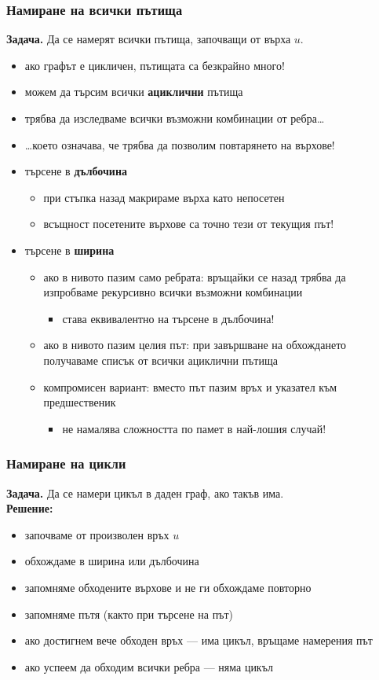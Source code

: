 \documentclass[alsotrans,beameroptions={aspectratio=169}]{beamerswitch}
\begin{document}
\begin{frame}
  \frametitle{Намиране на всички пътища}
  \textbf{Задача. } Да се намерят всички пътища, започващи от върха $u$.\pause
  \begin{itemize}[<+->]
  \item ако графът е цикличен, пътищата са безкрайно много!
  \item можем да търсим всички \textbf{ациклични} пътища
  \item трябва да изследваме всички възможни комбинации от ребра\ldots
  \item \ldots което означава, че трябва да позволим повтарянето на върхове!
  \item търсене в \textbf{дълбочина}
    \begin{itemize}
    \item при стъпка назад макрираме върха като непосетен
    \item всъщност посетените върхове са точно тези от текущия път!
    \end{itemize}
  \item търсене в \textbf{ширина}
    \begin{itemize}
    \item ако в нивото пазим само ребрата: връщайки се назад трябва да изпробваме рекурсивно всички възможни комбинации
      \begin{itemize}
      \item става еквивалентно на търсене в дълбочина!
      \end{itemize}
    \item ако в нивото пазим целия път: при завършване на обхождането получаваме списък от всички ациклични пътища
    \item компромисен вариант: вместо път пазим връх и указател към предшественик
      \begin{itemize}
      \item не намалява сложността по памет в най-лошия случай!
      \end{itemize}
    \end{itemize}
  \end{itemize}
\end{frame}

\begin{frame}
  \frametitle{Намиране на цикли}
  \textbf{Задача. }Да се намери цикъл в даден граф, ако такъв има.\\
  \pause
  \textbf{Решение:}\\
  \begin{itemize}[<+->]
  \item започваме от произволен връх $u$
  \item обхождаме в ширина или дълбочина
  \item запомняме обходените върхове и не ги обхождаме повторно
  \item запомняме пътя (както при търсене на път)
  \item ако достигнем вече обходен връх --- има цикъл, връщаме намерения път
  \item ако успеем да обходим всички ребра --- няма цикъл
  \end{itemize}
\end{frame}
\end{document}
